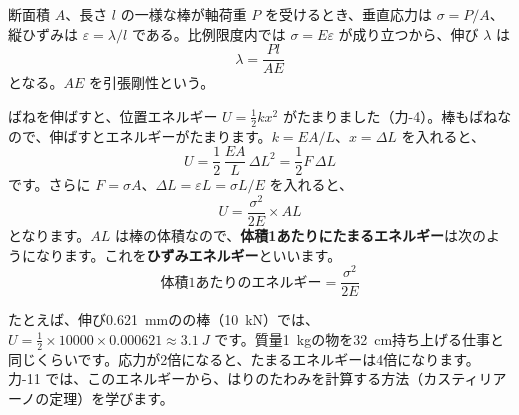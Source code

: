 
\begin{kotoba}\small
{}
\end{kotoba}

\begin{senmonsho}[材料力学の教科書ふうの書き方]
\begin{bkhonbun}
断面積 $A$、長さ $l$ の一様な棒が軸荷重 $P$ を受けるとき、垂直応力は $\sigma=P/A$、縦ひずみは $\varepsilon=\lambda/l$ である。比例限度内では $\sigma=E\varepsilon$ が成り立つから、伸び $\lambda$ は
\[\lambda=\frac{Pl}{AE}\tag{1.5}\]
となる。$AE$ を引張剛性という。
\end{bkhonbun}
\end{senmonsho}

\begin{motto}[4]
ばねを伸ばすと、位置エネルギー $U=\tfrac{1}{2}kx^2$ がたまりました（力-4）。棒もばねなので、伸ばすとエネルギーがたまります。$k=EA/L$、$x=\Delta L$ を入れると、
\[U=\frac{1}{2}\,\frac{EA}{L}\,\Delta L^2=\frac{1}{2}F\,\Delta L\]
です。さらに $F=\sigma A$、$\Delta L=\varepsilon L=\sigma L/E$ を入れると、
\[U=\frac{\sigma^2}{2E}\times AL\]
となります。$AL$ は棒の体積なので、\textbf{体積1あたりにたまるエネルギー}は次のようになります。これを\textbf{ひずみエネルギー}といいます。
\[\text{体積1あたりのエネルギー}=\frac{\sigma^2}{2E}\]

たとえば、伸び\qty{0.621}{mm}の\bkhatenaref の棒（\qty{10}{kN}）では、$U=\tfrac{1}{2}\times\num{10000}\times0.000621\approx\qty{3.1}{J}$ です。質量\qty{1}{kg}の物を\qty{32}{cm}持ち上げる仕事と同じくらいです。応力が2倍になると、たまるエネルギーは4倍になります。力-11 では、このエネルギーから、はりのたわみを計算する方法（カスティリアーノの定理）を学びます。
\end{motto}


